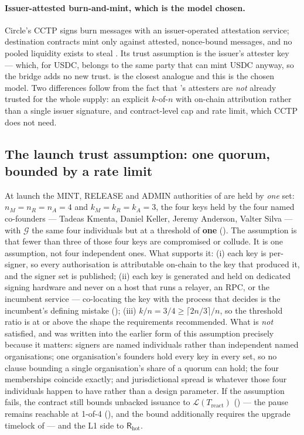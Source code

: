 \paragraph{Issuer-attested burn-and-mint, which is the model chosen.} Circle's CCTP signs burn
messages with an issuer-operated attestation service; destination contracts mint only against
attested, nonce-bound messages, and no pooled liquidity exists to steal \citep{cctp}. Its trust
assumption is the issuer's attester key --- which, for USDC, belongs to the same party that can mint
USDC anyway, so the bridge adds no new trust. \Flux is the closest analogue and this is the chosen
model. Two differences follow from the fact that \Flux's attesters are \emph{not} already trusted for
the whole supply: an explicit $k$-of-$n$ with on-chain attribution rather than a single issuer
signature, and contract-level cap and rate limit, which CCTP does not need.

\subsection{The launch trust assumption: one quorum, bounded by a rate limit}
\label{sec:bridging-assumption}

\begin{assumption}
\label{as:admin}
At launch the MINT, RELEASE and ADMIN authorities of  are held by \emph{one}
set: $n_M = n_R = n_A = 4$ and $k_M = k_R = k_A = 3$, the four keys held by the four named
co-founders --- Tadeas Kmenta, Daniel Keller, Jeremy Anderson, Valter Silva
 --- with $\mathcal{G}$ the same four individuals but at a
threshold of \textbf{one} (). The assumption is that fewer than three of
those four keys are compromised or collude. It is one assumption, not four independent ones. What
supports it:
(i) each key is per-signer, so every authorisation is attributable on-chain to the key that produced
it, and the signer set is published;
(ii) each key is generated and held on dedicated signing hardware and never on a host that runs a
relayer, an RPC, or the incumbent service --- co-locating the key with the process that decides is
the incumbent's defining mistake ();
(iii) $k/n = 3/4 \ge \lceil 2n/3 \rceil / n$, so the threshold ratio is at or above the shape the
requirements recommended.
What is \emph{not} satisfied, and was written into the earlier form of this assumption precisely
because it matters: signers are named individuals rather than independent named organisations; one
organisation's founders hold every key in every set, so no clause bounding a single organisation's
share of a quorum can hold; the four memberships coincide exactly; and jurisdictional spread is
whatever those four individuals happen to have rather than a design parameter.
If the assumption fails, the contract still bounds unbacked issuance to
$\mathcal{L}(T_{\mathrm{react}})$ () --- the pause remains reachable at 1-of-4
(), and the bound additionally requires the upgrade timelock of
 --- and the L1 side to $\mathsf{R}_{\mathrm{hot}}$. \planned
\end{assumption}

